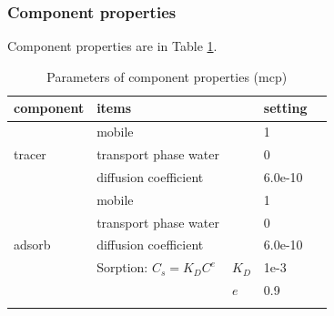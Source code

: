 \subsubsection*{Component properties}
Component properties are in Table \ref{us:mcp-warricksetting}.\\
\begin{table}[H]
 \centering
 \caption{Parameters of component properties (mcp)}
 \centering \label{us:mcp-warricksetting}
 \begin{tabular}{lllll}
 \hline\hline\noalign{\smallskip}
 component &  items & &setting  \\ \hline
           &  mobile & &1  \\
  tracer   &  transport phase water & &0  \\
           &  diffusion coefficient  & &6.0e-10  \\
 \hline
           &  mobile & &1   \\
           &  transport phase water & &0  \\
  adsorb   &  diffusion coefficient  & &6.0e-10 \\
           &  Sorption: $C_s=K_DC^e$& $K_D$ & 1e-3 \\
           &                        & $e$ & 0.9\\
\noalign{\smallskip}\hline\hline
\end{tabular}
\end{table}
